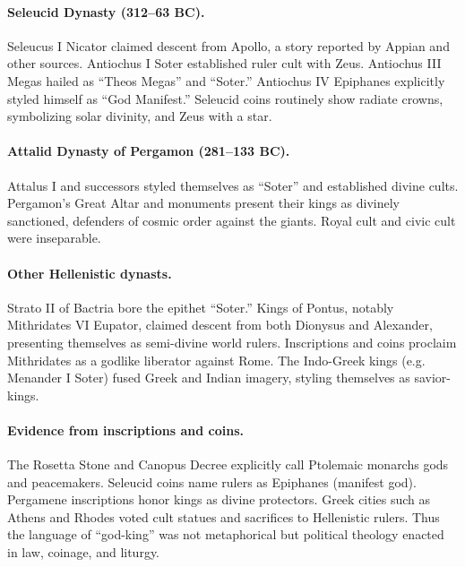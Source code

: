\paragraph{Seleucid Dynasty (312–63 BC).}
Seleucus I Nicator claimed descent from Apollo, a story reported by Appian and other sources.
Antiochus I Soter established ruler cult with Zeus.
Antiochus III Megas hailed as “Theos Megas” and “Soter.”
Antiochus IV Epiphanes explicitly styled himself as “God Manifest.”
Seleucid coins routinely show radiate crowns, symbolizing solar divinity, and Zeus with a star.

\paragraph{Attalid Dynasty of Pergamon (281–133 BC).}
Attalus I and successors styled themselves as “Soter” and established divine cults.
Pergamon’s Great Altar and monuments present their kings as divinely sanctioned, defenders of cosmic order against the giants.
Royal cult and civic cult were inseparable.

\paragraph{Other Hellenistic dynasts.}
Strato II of Bactria bore the epithet “Soter.”
Kings of Pontus, notably Mithridates VI Eupator, claimed descent from both Dionysus and Alexander, presenting themselves as semi-divine world rulers.
Inscriptions and coins proclaim Mithridates as a godlike liberator against Rome.
The Indo-Greek kings (e.g. Menander I Soter) fused Greek and Indian imagery, styling themselves as savior-kings.

\paragraph{Evidence from inscriptions and coins.}
The Rosetta Stone and Canopus Decree explicitly call Ptolemaic monarchs gods and peacemakers.
Seleucid coins name rulers as Epiphanes (manifest god).
Pergamene inscriptions honor kings as divine protectors.
Greek cities such as Athens and Rhodes voted cult statues and sacrifices to Hellenistic rulers.
Thus the language of “god-king” was not metaphorical but political theology enacted in law, coinage, and liturgy.

